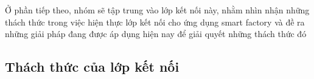 Ở phần tiếp theo, nhóm sẽ tập trung vào lớp kết nối này, nhằm nhìn nhận những thách thức trong việc hiện thực lớp kết nối cho ứng dụng smart factory và đề ra những giải pháp đang được áp dụng hiện nay để giải quyết những thách thức đó


\subsection{Thách thức của lớp kết nối}


    
    

